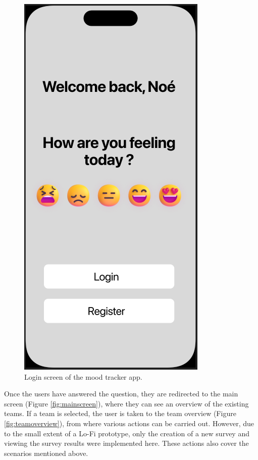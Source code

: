 \documentclass[11pt]{article}
\begin{document}
\begin{figure}[h!]
    \centering
    \includegraphics[width=0.3\linewidth]{figures/Login-Screen.PNG}
    \caption{Login screen of the mood tracker app.}
    \label{fig:login}
\end{figure}
Once the users have answered the question, they are redirected to the main screen (Figure \ref{fig:mainscreen}), where they can see an overview of the existing teams. If a team is selected, the user is taken to the team overview (Figure \ref{fig:teamoverview}), from where various actions can be carried out. However, due to the small extent of a Lo-Fi prototype, only the creation of a new survey and viewing the survey results were implemented here. These actions also cover the scenarios mentioned above.
\end{document}
